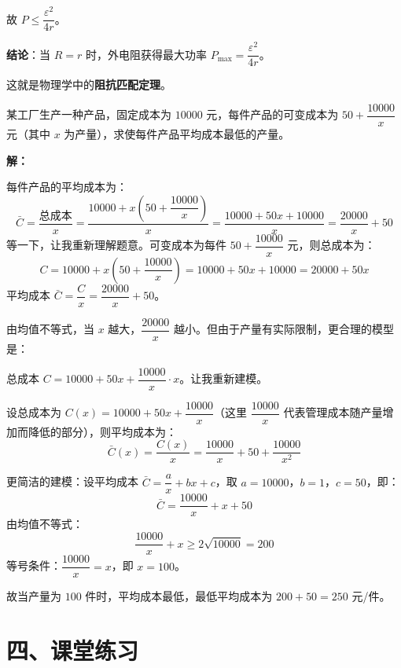 \documentclass[12pt, a4paper]{ctexart}
\begin{document}
故 $P \leqslant \dfrac{\varepsilon^2}{4r}$。

\textbf{结论}：当 $R = r$ 时，外电阻获得最大功率 $P_{\max} = \boxed{\dfrac{\varepsilon^2}{4r}}$。

这就是物理学中的\textbf{阻抗匹配定理}。

\begin{appbox}
某工厂生产一种产品，固定成本为 $10000$ 元，每件产品的可变成本为 $50+\dfrac{10000}{x}$ 元（其中 $x$ 为产量），求使每件产品平均成本最低的产量。
\end{appbox}

\textbf{解：}

每件产品的平均成本为：
\[
\bar{C} = \frac{\text{总成本}}{x} = \frac{10000 + x\left(50+\dfrac{10000}{x}\right)}{x} = \frac{10000+50x+10000}{x} = \frac{20000}{x}+50
\]
等一下，让我重新理解题意。可变成本为每件 $50+\dfrac{10000}{x}$ 元，则总成本为：
\[
C = 10000 + x\left(50+\frac{10000}{x}\right) = 10000+50x+10000 = 20000+50x
\]
平均成本 $\bar{C} = \dfrac{C}{x} = \dfrac{20000}{x}+50$。

由均值不等式，当 $x$ 越大，$\dfrac{20000}{x}$ 越小。但由于产量有实际限制，更合理的模型是：

总成本 $C = 10000 + 50x + \dfrac{10000}{x} \cdot x$。让我重新建模。

设总成本为 $C(x) = 10000+50x+\dfrac{10000}{x}$（这里 $\dfrac{10000}{x}$ 代表管理成本随产量增加而降低的部分），则平均成本为：
\[
\bar{C}(x) = \frac{C(x)}{x} = \frac{10000}{x}+50+\frac{10000}{x^2}
\]

更简洁的建模：设平均成本 $\bar{C} = \dfrac{a}{x}+bx+c$，取 $a=10000$，$b=1$，$c=50$，即：
\[
\bar{C} = \frac{10000}{x}+x+50
\]
由均值不等式：
\[
\frac{10000}{x}+x \geqslant 2\sqrt{10000} = 200
\]
等号条件：$\dfrac{10000}{x}=x$，即 $x=100$。

故当产量为 $\boxed{100}$ 件时，平均成本最低，最低平均成本为 $200+50 = 250$ 元/件。

\newpage

\section*{\textcolor{tipgreen}{四、课堂练习}}
\end{document}
